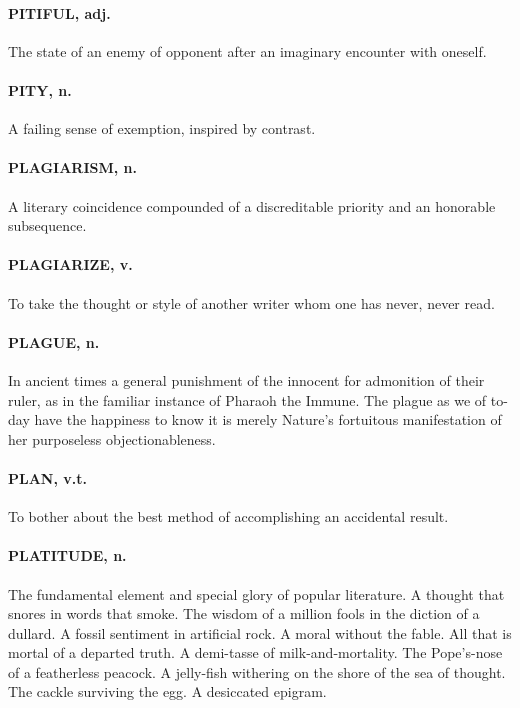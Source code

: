 \documentclass[11pt]{article}
\begin{document}
\paragraph{PITIFUL, adj.}  The state of an enemy of opponent after an imaginary
encounter with oneself.

\paragraph{PITY, n.}  A failing sense of exemption, inspired by contrast.

\paragraph{PLAGIARISM, n.}  A literary coincidence compounded of a discreditable
priority and an honorable subsequence.

\paragraph{PLAGIARIZE, v.}  To take the thought or style of another writer whom
one has never, never read.

\paragraph{PLAGUE, n.}  In ancient times a general punishment of the innocent for
admonition of their ruler, as in the familiar instance of Pharaoh the
Immune.  The plague as we of to-day have the happiness to know it is
merely Nature's fortuitous manifestation of her purposeless
objectionableness.

\paragraph{PLAN, v.t.}  To bother about the best method of accomplishing an
accidental result.

\paragraph{PLATITUDE, n.}  The fundamental element and special glory of popular
literature. A thought that snores in words that smoke.  The wisdom of
a million fools in the diction of a dullard.  A fossil sentiment in
artificial rock.  A moral without the fable.  All that is mortal of a
departed truth.  A demi-tasse of milk-and-mortality.  The Pope's-nose
of a featherless peacock.  A jelly-fish withering on the shore of the
sea of thought.  The cackle surviving the egg.  A desiccated epigram.
\end{document}
